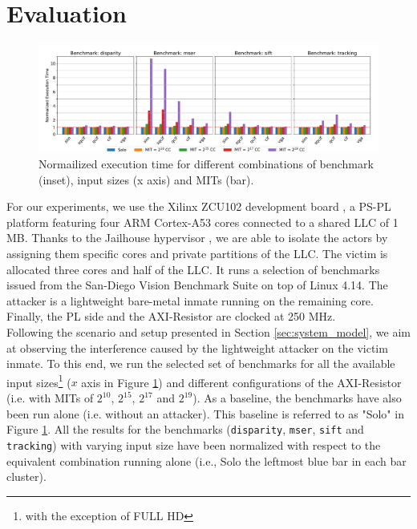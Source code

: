 \section{Evaluation}
    \label{sec:evaluation}
    \begin{figure}
        \centering
        \includegraphics[scale=0.425]{images/cpu-brainfreeze-interference.pdf}
        \caption{Normailized execution time for different combinations of benchmark (inset), input sizes (x axis) and MITs (bar).}
        \label{fig:cpu-brainfreeze-interference-results}
    \end{figure}

    For our experiments, we use the Xilinx ZCU102 development board \cite{Xilinx-ULTRASCALE-TRM}, a PS-PL platform featuring four ARM Cortex-A53 cores \cite{ARM-cortex-A53} connected to a shared LLC of 1 MB.
    Thanks to the Jailhouse hypervisor \cite{jailhouse}, we are able to isolate the actors by assigning them specific cores and private partitions of the LLC.
    The victim is allocated three cores and half of the LLC.
    It runs a selection of benchmarks issued from the San-Diego Vision Benchmark Suite \cite{SD-VBS} on top of Linux 4.14.
    The attacker is a lightweight bare-metal inmate running on the remaining core.
    Finally, the PL side and the AXI-Resistor are clocked at 250 MHz.\\

    Following the scenario and setup presented in Section \ref{sec:system_model}, we aim at observing the interference caused by the lightweight attacker on the victim inmate.
    To this end, we run the selected set of benchmarks for all the available input sizes\footnote{with the exception of FULL HD} ($x$ axis in Figure \ref{fig:cpu-brainfreeze-interference-results}) and different configurations of the AXI-Resistor (i.e. with MITs of $2^{10}$, $2^{15}$, $2^{17}$ and $2^{19}$).
    As a baseline, the benchmarks have also been run alone (i.e. without an attacker).
    This baseline is referred to as "Solo" in Figure \ref{fig:cpu-brainfreeze-interference-results}.
    All the results for the benchmarks (\texttt{disparity}, \texttt{mser}, \texttt{sift} and \texttt{tracking}) with varying input size have been normalized with respect to the equivalent combination running alone (i.e., Solo the leftmost blue bar in each bar cluster).

